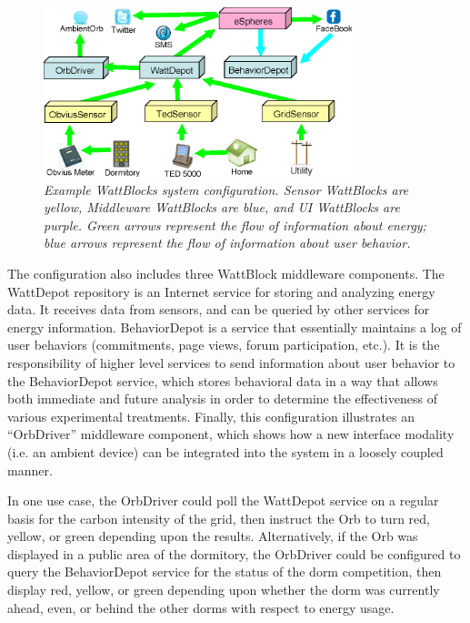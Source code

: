 \begin{figure}[th]
  \center
  \includegraphics[width=0.8\textwidth]{architecture.4.eps}
  \caption{\em \small Example WattBlocks system configuration. Sensor WattBlocks are
    yellow, Middleware WattBlocks are blue, and UI WattBlocks are purple.
    Green arrows represent the flow of information about energy; blue
    arrows represent the flow of information about user behavior.}
  \label{fig:WattBlocks}
\end{figure} 

The configuration also includes three WattBlock middleware components.  The
WattDepot repository is an Internet service for storing and analyzing
energy data.  It receives data from sensors, and can be queried by other
services for energy information.  BehaviorDepot is a service that
essentially maintains a log of user behaviors (commitments, page views,
forum participation, etc.).  It is the responsibility of higher level
services to send information about user behavior to the BehaviorDepot
service, which stores behavioral data in a way that allows both immediate
and future analysis in order to determine the effectiveness of various
experimental treatments.  Finally, this configuration illustrates an
``OrbDriver'' middleware component, which shows how a new interface
modality (i.e. an ambient device) can be integrated into the system in a
loosely coupled manner.

In one use case,  the OrbDriver could poll the WattDepot service on a regular
basis for the carbon intensity of the grid, then instruct the Orb to turn
red, yellow, or green depending upon the results. Alternatively, if the Orb
was displayed in a public area of the dormitory, the OrbDriver could be
configured to query the BehaviorDepot service for the status of the dorm
competition, then display red, yellow, or green depending upon whether the
dorm was currently ahead, even, or behind the other dorms with respect to
energy usage.

